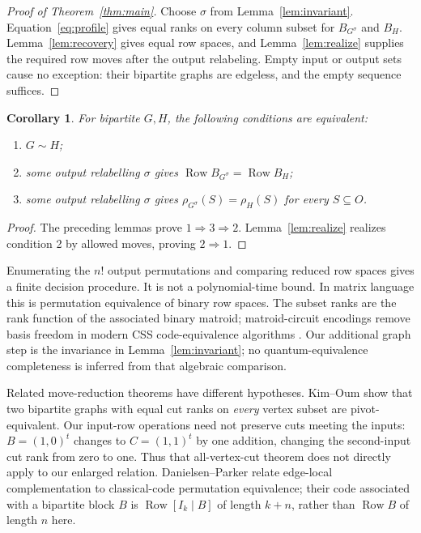 \documentclass[11pt]{article}
\newtheorem{corollary}[theorem]{Corollary}
\newcommand{\Row}{\operatorname{Row}}
\begin{document}
\begin{proof}[Proof of Theorem~\ref{thm:main}]
Choose $\sigma$ from Lemma~\ref{lem:invariant}. Equation~\eqref{eq:profile}
gives equal ranks on every column subset for $B_{G^\sigma}$ and $B_H$.
Lemma~\ref{lem:recovery} gives equal row spaces, and
Lemma~\ref{lem:realize} supplies the required row moves after the output
relabeling. Empty input or output sets cause no exception: their
bipartite graphs are edgeless, and the empty sequence suffices.
\end{proof}

\begin{corollary}\label{cor:criterion}
For bipartite $G,H$, the following conditions are equivalent:
\begin{enumerate}
\item $G\sim H$;
\item some output relabelling $\sigma$ gives
$\Row B_{G^\sigma}=\Row B_H$;
\item some output relabelling $\sigma$ gives
$\rho_{G^\sigma}(S)=\rho_H(S)$ for every $S\subseteq O$.
\end{enumerate}
\end{corollary}
\begin{proof}
The preceding lemmas prove $1\Rightarrow3\Rightarrow2$.
Lemma~\ref{lem:realize} realizes condition 2 by allowed moves, proving
$2\Rightarrow1$.
\end{proof}

Enumerating the $n!$ output permutations and comparing reduced row
spaces gives a finite decision procedure. It is not a polynomial-time
bound. In matrix language this is permutation equivalence of binary row
spaces. The subset ranks are the rank function of the associated binary
matroid; matroid-circuit encodings remove basis freedom in modern CSS
code-equivalence algorithms \cite[Section 6.4.1]{BSW}. Our additional graph
step is the invariance in Lemma~\ref{lem:invariant}; no quantum-equivalence
completeness is inferred from that algebraic comparison.

Related move-reduction theorems have different hypotheses.
Kim--Oum \cite[Theorem 5.3, p.~7]{KO} show that two bipartite graphs
with equal cut ranks on \emph{every} vertex subset are pivot-equivalent.
Our input-row operations need not preserve cuts meeting the inputs:
$B=(1,0)^t$ changes to $C=(1,1)^t$ by one addition, changing the
second-input cut rank from zero to one. Thus that all-vertex-cut theorem
does not directly apply to our enlarged relation.
Danielsen--Parker \cite[Theorems 1--2, pp.~5--7]{DP} relate edge-local
complementation to classical-code permutation equivalence; their code
associated with a bipartite block $B$ is $\Row[I_k\mid B]$ of length
$k+n$, rather than $\Row B$ of length $n$ here.
\end{document}
